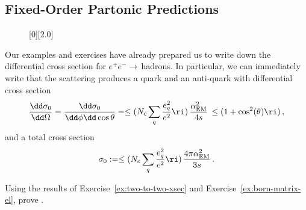 \subsection{Fixed-Order Partonic Predictions}
\label{sec:ee-decay}

\begin{figure}[t!]
    \centering
    [0][2.0]

    \caption{
    }

    \label{fig:ee_lo}
\end{figure}


Our examples and exercises have already prepared us to write down the  differential cross section for \(e^+ e^-\to\,\)hadrons.
%
In particular, we can immediately write that the scattering produces a quark and an anti-quark with differential cross section
\begin{align}
    \label{eq:born-diff-xsec}
    \frac{\dd\sigma_0}{\dd\Omega}
    =
    \frac{\dd\sigma_0}{\dd\phi \dd\cos\theta}
    =
    \le(
    N_c \sum_q \frac{e_q^2}{e^2}
    \ri)
    \,
    \frac{\alpha_\text{EM}^2}{4 s}
    \,
    \le(1 + \cos^2(\theta)\ri)
    \,,
\end{align}
and a total cross section
\begin{align}
    \label{eq:born-xsec}
    \sigma_0
    :=
    \le(
    N_c \sum_q \frac{e_q^2}{e^2}
    \ri)
    \,
    \frac{4 \pi \alpha_\text{EM}^2}{3 s}
    \,.
\end{align}

\begin{exercise}
    Using the results of Exercise~\ref{ex:two-to-two-xsec} and Exercise~\ref{ex:born-matrix-el}, prove .
\end{exercise}


